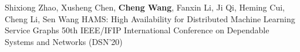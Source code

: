 \cvpub
{Shixiong Zhao, Xusheng Chen, \textbf{Cheng Wang}, Fanxin Li, Ji Qi, Heming Cui, Cheng Li, Sen Wang} %
{HAMS: High Availability for Distributed Machine Learning Service Graphs} %
{} %
{} %
{ %
50th IEEE/IFIP International Conference on Dependable Systems and Networks (DSN'20) \newline
}
